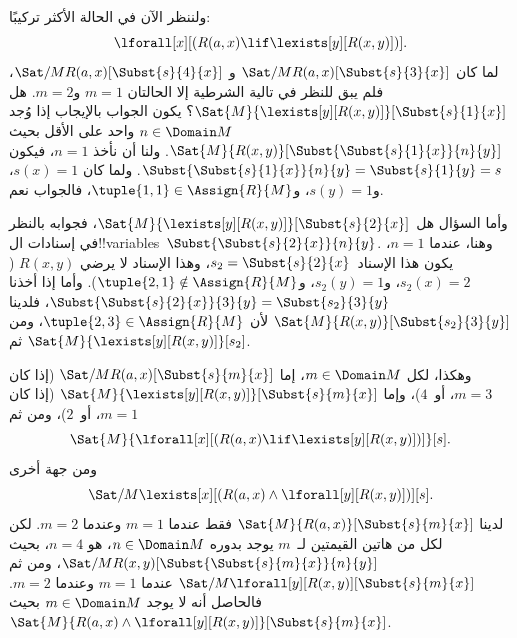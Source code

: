 \documentclass[../../../include/open-logic-section]{subfiles}
\begin{document}
\begin{ex}

ولننظر الآن في الحالة الأكثر تركيبًا:
\[
\lforall[x][(R(a,x) \lif \lexists[y][R(x,y)])].
\]
لما كان $\Sat/{M}{R(a,x)}[\Subst{s}{3}{x}]$ و
$\Sat/{M}{R(a,x)}[\Subst{s}{4}{x}]$، فلم يبق للنظر في تالية الشرطية إلا الحالتان $m = 1$
و$m = 2$. هل $\Sat{M}{\lexists[y][R(x,y)]}[\Subst{s}{1}{x}]$؟
يكون الجواب بالإيجاب إذا وُجد $n \in \Domain M$ واحد على الأقل بحيث
$\Sat{M}{R(x,y)}[\Subst{\Subst{s}{1}{x}}{n}{y}]$. ولنا أن
نأخذ $n = 1$، فيكون
$\Subst{\Subst{s}{1}{x}}{n}{y} = \Subst{s}{1}{y} = s$. ولما كان
$s(x) = 1$، و$s(y) = 1$، و$\tuple{1,1} \in \Assign{R}{M}$، فالجواب
نعم.

وأما السؤال هل
$\Sat{M}{\lexists[y][R(x,y)]}[\Subst{s}{2}{x}]$، فجوابه بالنظر في
إسنادات ال!!{variable}s~$\Subst{\Subst{s}{2}{x}}{n}{y}$. وهنا،
عندما $n = 1$، يكون هذا الإسناد~$s_2 = \Subst{s}{2}{x}$، وهذا الإسناد لا
يرضي $R(x,y)$ ($s_2(x) = 2$، و$s_2(y) = 1$،
و$\tuple{2,1}\notin \Assign{R}{M}$). وأما إذا أخذنا
$\Subst{\Subst{s}{2}{x}}{3}{y} = \Subst{s_2}{3}{y}$،
فلدينا $\Sat{M}{R(x,y)}[\Subst{s_2}{3}{y}]$ لأن
$\tuple{2,3} \in \Assign{R}{M}$، ومن ثم
$\Sat{M}{\lexists[y][R(x,y)]}[s_2]$.

وهكذا، لكل $m \in \Domain M$، إما
$\Sat/{M}{R(a,x)}[\Subst{s}{m}{x}]$ (إذا كان $m = 3$، أو~$4$)،
وإما $\Sat{M}{\lexists[y][R(x,y)]}[\Subst{s}{m}{x}]$ (إذا كان
$m = 1$، أو~$2$)، ومن ثم
\[
\Sat{M}{\lforall[x][(R(a,x) \lif \lexists[y][R(x,y)])]}[s].
\]
ومن جهة أخرى
\[
\Sat/{M}{\lexists[x][(R(a,x) \land \lforall[y][R(x,y)])]}[s].
\]
لدينا $\Sat{M}{R(a,x)}[\Subst{s}{m}{x}]$ فقط عندما $m = 1$ وعندما
$m = 2$. لكن لكل من هاتين القيمتين لـ~$m$ يوجد بدوره
$n \in \Domain M$، هو $n = 4$، بحيث
$\Sat/{M}{R(x,y)}[\Subst{\Subst{s}{m}{x}}{n}{y}]$، ومن ثم
$\Sat/{M}{\lforall[y][R(x,y)]}[\Subst{s}{m}{x}]$ عندما $m = 1$
وعندما $m = 2$. فالحاصل أنه لا يوجد $m \in \Domain M$ بحيث
$\Sat{M}{R(a,x) \land \lforall[y][R(x,y)]}[\Subst{s}{m}{x}]$.
\end{ex}
\end{document}
